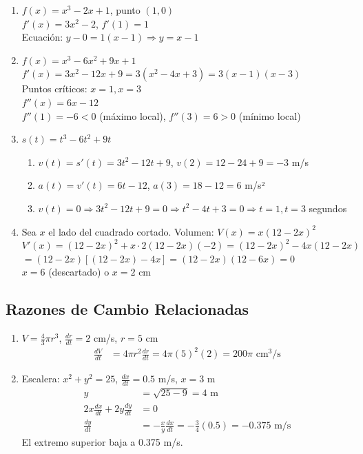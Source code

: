 \documentclass[12pt,a4paper]{article}
\begin{document}
\begin{enumerate}
    \item $f(x) = x^3 - 2x + 1$, punto $(1, 0)$\\
    $f'(x) = 3x^2 - 2$, $f'(1) = 1$\\
    Ecuación: $y - 0 = 1(x - 1) \Rightarrow y = x - 1$
    
    \item $f(x) = x^3 - 6x^2 + 9x + 1$\\
    $f'(x) = 3x^2 - 12x + 9 = 3(x^2 - 4x + 3) = 3(x - 1)(x - 3)$\\
    Puntos críticos: $x = 1, x = 3$\\
    $f''(x) = 6x - 12$\\
    $f''(1) = -6 < 0$ (máximo local), $f''(3) = 6 > 0$ (mínimo local)
    
    \item $s(t) = t^3 - 6t^2 + 9t$
    \begin{enumerate}
        \item $v(t) = s'(t) = 3t^2 - 12t + 9$, $v(2) = 12 - 24 + 9 = -3$ m/s
        \item $a(t) = v'(t) = 6t - 12$, $a(3) = 18 - 12 = 6$ m/s²
        \item $v(t) = 0 \Rightarrow 3t^2 - 12t + 9 = 0 \Rightarrow t^2 - 4t + 3 = 0 \Rightarrow t = 1, t = 3$ segundos
    \end{enumerate}
    
    \item Sea $x$ el lado del cuadrado cortado. Volumen: $V(x) = x(12 - 2x)^2$\\
    $V'(x) = (12 - 2x)^2 + x \cdot 2(12 - 2x)(-2) = (12 - 2x)^2 - 4x(12 - 2x)$\\
    $= (12 - 2x)[(12 - 2x) - 4x] = (12 - 2x)(12 - 6x) = 0$\\
    $x = 6$ (descartado) o $x = 2$ cm
\end{enumerate}

\subsection{Razones de Cambio Relacionadas}

\begin{enumerate}
    \item $V = \frac{4}{3}\pi r^3$, $\frac{dr}{dt} = 2$ cm/s, $r = 5$ cm
    \begin{align*}
        \frac{dV}{dt} &= 4\pi r^2 \frac{dr}{dt} = 4\pi(5)^2(2) = 200\pi \text{ cm}^3/\text{s}
    \end{align*}
    
    \item Escalera: $x^2 + y^2 = 25$, $\frac{dx}{dt} = 0.5$ m/s, $x = 3$ m
    \begin{align*}
        y &= \sqrt{25 - 9} = 4 \text{ m}\\
        2x\frac{dx}{dt} + 2y\frac{dy}{dt} &= 0\\
        \frac{dy}{dt} &= -\frac{x}{y}\frac{dx}{dt} = -\frac{3}{4}(0.5) = -0.375 \text{ m/s}
    \end{align*}
    El extremo superior baja a 0.375 m/s.
\end{enumerate}
\end{document}
